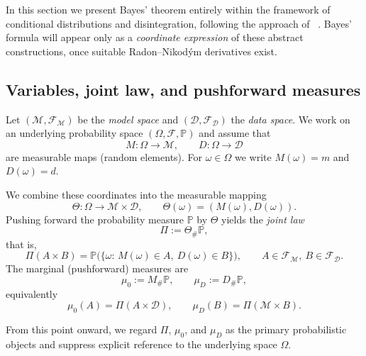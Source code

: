 \documentclass[11pt]{article}
\theoremstyle{remark}
\newcommand{\modelspace}{\mathcal{M}}
\newcommand{\dataspace}{\mathcal{D}}
\begin{document}
In this section we present Bayes' theorem entirely within the framework of
conditional distributions and disintegration, following the approach of ~\citet[Chapter~5]{Kallenberg2021}.  Bayes' formula will appear only as
a \emph{coordinate expression} of these abstract constructions, once suitable
Radon--Nikodým derivatives exist.

\subsection{Variables, joint law, and pushforward measures}

Let \((\modelspace,\mathcal F_{\modelspace})\) be the \emph{model space} and
\((\dataspace,\mathcal F_{\dataspace})\) the \emph{data space}.  We work on an
underlying probability space \((\Omega,\mathcal F,\mathbb P)\) and assume that
\begin{equation}
  M:\Omega\to\modelspace,
  \qquad
  D:\Omega\to\dataspace
\end{equation}
are measurable maps (random elements).  For \(\omega\in\Omega\) we write
\(M(\omega)=m\) and \(D(\omega)=d\).

We combine these coordinates into the measurable mapping
\begin{equation}
  \Theta:\Omega\to\modelspace\times\dataspace,
  \qquad
  \Theta(\omega)=(M(\omega),D(\omega)).
\end{equation}
Pushing forward the probability measure \(\mathbb P\) by \(\Theta\) yields the
\emph{joint law}
\begin{equation}
  \Pi := \Theta_{\#}\mathbb P,
\end{equation}
that is,
\begin{equation}
  \Pi(A\times B)
  =
  \mathbb P\bigl(\{\omega:\,M(\omega)\in A,\ D(\omega)\in B\}\bigr),
  \qquad
  A\in\mathcal F_{\modelspace},\ B\in\mathcal F_{\dataspace}.
\end{equation}
The marginal (pushforward) measures are
\begin{equation}
  \mu_0 := M_{\#}\mathbb P,
  \qquad
  \mu_D := D_{\#}\mathbb P,
\end{equation}
equivalently
\begin{equation}
  \mu_0(A)=\Pi(A\times\dataspace),
  \qquad
  \mu_D(B)=\Pi(\modelspace\times B).
\end{equation}

From this point onward, we regard \(\Pi\), \(\mu_0\), and \(\mu_D\) as the
primary probabilistic objects and suppress explicit reference to the
underlying space \(\Omega\).  
\end{document}
